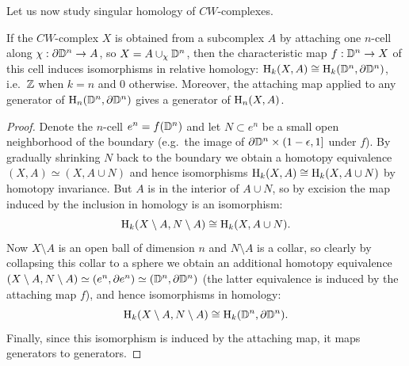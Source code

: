 Let us now study singular homology of $CW$-complexes.


\begin{prop}\label{lem 39.1 munkres}
    If the $CW$-complex $X$ is obtained from a subcomplex $A$ by attaching one $n$-cell along $\chi:\partial \mathbb{D}^n\to A$, so $X=A\cup_\chi \mathbb{D}^n$, then the characteristic map $f:\mathbb{D}^n\to X$ of this cell induces isomorphisms in relative homology: $\mathrm{H}_k(X,A)\cong \mathrm{H}_k(\mathbb{D}^n,\partial \mathbb{D}^n)$, i.e.~$\mathbb{Z}$ when $k=n$ and $0$ otherwise. Moreover, the attaching map applied to any generator of $\mathrm{H}_n(\mathbb{D}^n,\partial \mathbb{D}^n)$ gives a generator of $\mathrm{H}_n(X,A)$.
\end{prop}
\begin{proof}
    Denote the $n$-cell $e^n=f(\mathbb{D}^n)$ and let $N\subset e^n$ be a small open neighborhood of the boundary (e.g.~the image of $\partial \mathbb{D}^n\times (1-\epsilon,1]$ under $f$). By gradually shrinking $N$ back to the boundary we obtain a homotopy equivalence $(X,A)\simeq (X,A\cup N)$ and hence isomorphisms $\mathrm{H}_k(X,A)\cong \mathrm{H}_k(X,A\cup N)$ by homotopy invariance. But $A$ is in the interior of $A\cup N$, so by excision the map induced by the inclusion in homology is an isomorphism:
    \[\mathrm{H}_k(X\setminus A,N\setminus A)\cong \mathrm{H}_k(X,A\cup N).\]
    Now $X\setminus A$ is an open ball of dimension $n$ and $N\setminus A$ is a collar, so clearly by collapsing this collar to a sphere we obtain an additional homotopy equivalence $(X\setminus A,N\setminus A)\simeq (e^n,\partial e^n)\simeq (\mathbb{D}^n,\partial \mathbb{D}^n)$ (the latter equivalence is induced by the attaching map $f$), and hence isomorphisms in homology:
    \[\mathrm{H}_k(X\setminus A,N\setminus A)\cong \mathrm{H}_k(\mathbb{D}^n,\partial \mathbb{D}^n).\]
    Finally, since this isomorphism is induced by the attaching map, it maps generators to generators.
\end{proof}

